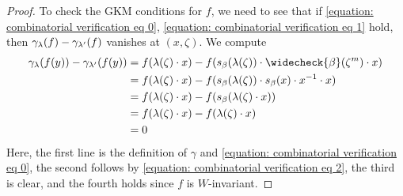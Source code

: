 \begin{proof}
To check the GKM conditions for $f$, we need to see that if \eqref{equation: combinatorial verification eq 0}, \eqref{equation: combinatorial verification eq 1} hold, then $\gamma_{\lambda}(f) - \gamma_{\lambda'}(f)$ vanishes at $(x, \zeta)$. We compute
\begin{align*}
\gamma_{\lambda}(f(y)) - \gamma_{\lambda'}(f(y)) 
&= f(\lambda(\zeta) \cdot x) - f(s_{\beta}(\lambda(\zeta)) \cdot \widecheck{\beta}(\zeta^m) \cdot x) \\ &= f(\lambda(\zeta) \cdot x) - f(s_{\beta}(\lambda(\zeta)) \cdot s_{\beta}(x) \cdot x^{-1} \cdot x) \\ 
&= f(\lambda(\zeta) \cdot x) - f(s_{\beta}(\lambda(\zeta) \cdot x)) \\
&= f(\lambda(\zeta) \cdot x) - f(\lambda(\zeta) \cdot x) \\
&= 0
\end{align*}
Here, the first line is the definition of $\gamma$ and \eqref{equation: combinatorial verification eq 0}, the second follows by \eqref{equation: combinatorial verification eq 2}, the third is clear, and the fourth holds since $f$ is $W$-invariant. 
\end{proof}



